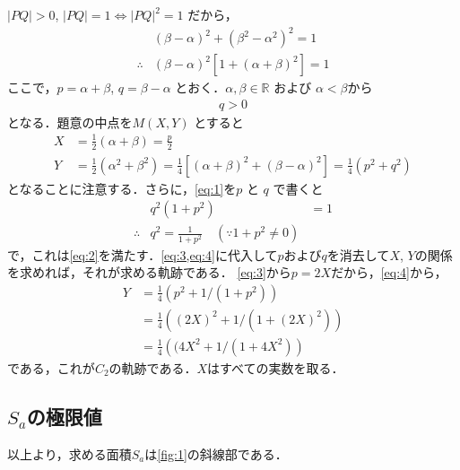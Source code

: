 \documentclass[a4paper,10pt]{ltjsarticle}
\begin{document}
\begin{multicols}{2}
$|PQ| > 0$, $|PQ|=1 \Longleftrightarrow |PQ|^2=1$ だから，
\begin{align}
&(\beta-\alpha)^2+(\beta^2-\alpha^2)^2 = 1 \nonumber \\
\therefore &(\beta-\alpha)^2\left[1 + (\alpha+\beta)^2\right] = 1 \label{eq:1}
\end{align}
ここで，$p=\alpha+\beta$, $q=\beta-\alpha$ とおく．$\alpha,\beta \in\mathbb{R}$ および $\alpha < \beta$から
\begin{align}
 q >0    \label{eq:2}
\end{align}
となる．題意の中点を$M(X,Y)$ とすると
\begin{align}
X &= \frac{1}{2}(\alpha+\beta)=\frac{p}{2} \label{eq:3}\\
Y &= \frac{1}{2}\left(\alpha^2+\beta^2\right) = \frac{1}{4}\left[(\alpha+\beta)^2+(\beta-\alpha)^2\right] = \frac{1}{4}\left(p^2+q^2\right)\label{eq:4}
\end{align}
となることに注意する．さらに，\cref{eq:1}を$p$ と $q$ で書くと
\begin{align*}
 & q^2(1+p^2) &= 1 \\
 \therefore 
 &q^2 = \frac{1}{1+p^2} \quad (\because 1+p^2\neq 0)
\end{align*}
で，これは\cref{eq:2}を満たす．\cref{eq:3,eq:4}に代入して$p$および$q$を消去して$X$, $Y$の関係を求めれば，それが求める軌跡である．
\cref{eq:3}から$p=2X$だから，\cref{eq:4}から，
\begin{align*}
Y 
&= \frac{1}{4}\left(p^2+1/(1+p^2)\right) \\
&= \frac{1}{4}\left((2X)^2+1/(1+(2X)^2)\right) \\
&= \frac{1}{4}\left((4X^2+1/(1+4X^2)\right) 
\end{align*}
である，これが$C_2$の軌跡である．$X$はすべての実数を取る．

\subsection{$S_{a}$の極限値}

以上より，求める面積$S_{a}$は\cref{fig:1}の斜線部である．

\begin{figure}[H]
\end{figure}
\end{multicols}
\end{document}
